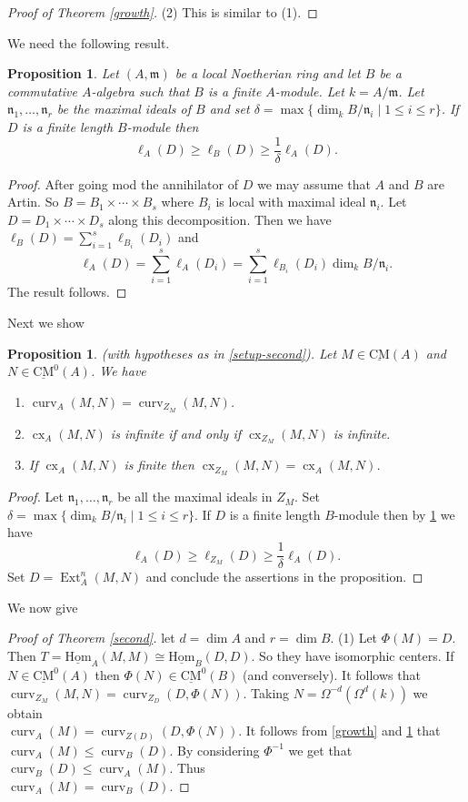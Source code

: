\documentclass{amsart}
\newcommand{\n}{\mathfrak{n} }
\newcommand{\m}{\mathfrak{m} }
\newcommand{\cx}{\operatorname{cx}}
\newcommand{\curv}{\operatorname{curv}}
\newcommand{\CMS}{\operatorname{\underline{CM}}}
\newcommand{\sHom}{\operatorname{\underline{Hom}}}
\newcommand{\Ext}{\operatorname{Ext}}
\theoremstyle{plain}
\newtheorem{proposition}[theorem]{Proposition}
\theoremstyle{definition}
\theoremstyle{remark}
\begin{document}
{\begin{proof}[Proof of Theorem \ref{growth}]
(2) This is similar to (1).
\end{proof}
We need the following result.
\begin{proposition}\label{bella}
Let $(A,\m)$ be a local Noetherian ring and let $B$ be a commutative $A$-algebra such that $B$ is a finite $A$-module. Let $k = A/\m$. Let $\n_1, \ldots,\n_r$ be the maximal ideals of $B$ and set $\delta = \max \{ \dim_k B/\n_i \mid 1 \leq i \leq r\}$. If $D$ is a finite length $B$-module then
\[
\ell_A(D) \geq \ell_B(D) \geq \frac{1}{\delta}\ell_A(D).
\]
\end{proposition}
\begin{proof}
  After going mod the annihilator of $D$ we may assume that $A$ and $B$ are Artin. So $B = B_1\times \cdots \times B_s$ where $B_i$ is local with maximal ideal $\n_i$. Let $D = D_1\times \cdots \times D_s$ along this decomposition.
  Then we have $\ell_B(D) = \sum_{i =1}^{s}\ell_{B_i}(D_i)$ and
  \[
  \ell_A(D) = \sum_{i = 1}^{s} \ell_A(D_i) = \sum_{i=1}^{s} \ell_{B_i}(D_i)\dim_k B/\n_i.
  \]
  The result follows.
\end{proof}
Next we show
\begin{proposition}\label{compare}
(with hypotheses as in \ref{setup-second}). Let $M \in \CMS(A)$ and $N \in \CMS^0(A)$. We have
\begin{enumerate}[\rm (1)]
  \item $\curv_A(M, N) = \curv_{Z_M}(M, N)$.
  \item $\cx_A(M, N)$ is infinite if and only if $\cx_{Z_M}(M, N)$ is infinite.
  \item If $\cx_A(M, N)$ is finite  then $\cx_{Z_M}(M, N) = \cx_A(M, N)$.
\end{enumerate}
\end{proposition}
\begin{proof}
Let $\n_1, \ldots, \n_r$ be all the maximal ideals in $Z_M$. Set $\delta = \max \{ \dim_k B/\n_i \mid 1 \leq i \leq r\}$. If $D$ is a finite length $B$-module then by \ref{bella} we have
\[
\ell_A(D) \geq \ell_{Z_M}(D) \geq \frac{1}{\delta}\ell_A(D).
\]
Set $D = \Ext^n_A(M, N)$ and conclude the assertions in the proposition.
\end{proof}
We now give
\begin{proof}[Proof of Theorem \ref{second}]
let $d = \dim A$ and $r = \dim B$.
(1) Let $\Phi(M) = D$. Then $T = \sHom_A(M, M) \cong \sHom_B(D, D)$. So they have isomorphic centers. If $N \in \CMS^0(A)$ then $\Phi(N) \in \CMS^0(B)$ (and conversely). It follows that
$\curv_{Z_M}(M, N) = \curv_{Z_D}(D, \Phi(N))$. Taking $N = \Omega^{-d}(\Omega^d(k))$ we obtain \\ $\curv_A(M) =\curv_{Z(D)}(D, \Phi(N))$. It follows from \ref{growth} and \ref{compare}  that
 $\curv_A(M) \leq \curv_B(D)$. By considering $\Phi^{-1}$ we get that $\curv_B(D) \leq \curv_A(M)$. Thus \\ $\curv_A(M) = \curv_B(D)$.


\end{proof}}
\end{document}
